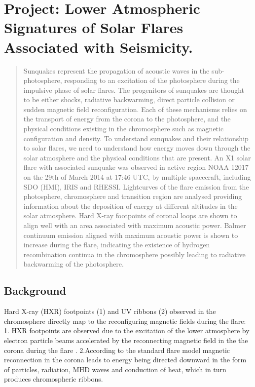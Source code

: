 \documentclass[11pt]{article}
\begin{document}
\section{Project: Lower Atmospheric Signatures of Solar Flares Associated with Seismicity.}\label{PRJ}
\begin{abstract}
Sunquakes represent the propagation of acoustic waves in the sub-photosphere, responding to an excitation of the photosphere during the impulsive phase of solar flares. The progenitors of sunquakes are thought to be either shocks, radiative backwarming, direct particle collision or sudden magnetic field reconfiguration. Each of these mechanisms relies on the transport of energy from the corona to the photosphere, and the physical conditions existing in the chromosphere such as magnetic configuration and density. To understand sunquakes and their relationship to solar flares, we need to understand how energy moves down through the solar atmosphere and the physical conditions that are present. An X1 solar flare with associated sunquake was observed in active region NOAA 12017 on the 29th of March 2014 at 17:46 UTC, by multiple spacecraft, including SDO (HMI), IRIS and RHESSI. Lightcurves of the flare emission from the photosphere, chromosphere and transition region are analysed providing information about the deposition of energy at different altitudes in the solar atmosphere. Hard X-ray footpoints of coronal loops are shown to align well with an area associated with maximum acoustic power. Balmer continuum emission aligned with maximum acoustic power is shown to increase during the flare, indicating the existence of hydrogen recombination continua in the chromosphere possibly leading to radiative backwarming of the photosphere. 
\end{abstract}

\subsection{Background}
Hard X-ray (HXR) footpoints (1) and UV ribbons (2) observed in the chromosphere directly map to the reconfiguring magnetic fields during the flare: 
1. HXR footpoints are observed due to the excitation of the lower atmosphere by electron particle beams accelerated by the reconnecting magnetic field in the the corona during the flare \citep{1995ApJ...455..347A}.
2.According to the standard flare model \citep{1964NASSP..50..451C, 1966Natur.211..695S, 1974SoPh...34..323H, 1976SoPh...50...85K} magnetic reconnection in the corona leads to energy being directed downward in the form of particles, radiation, MHD waves and conduction of heat, which in turn produces chromospheric ribbons.\\
\end{document}
